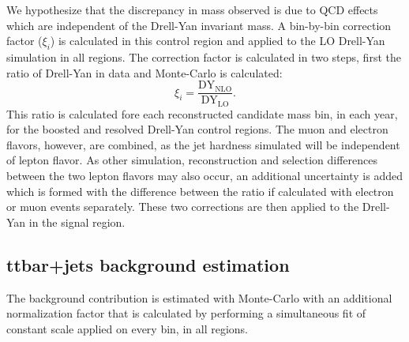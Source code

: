 We hypothesize that the discrepancy in \WR mass observed is due to QCD effects which are independent of the Drell-Yan invariant mass.
A bin-by-bin correction factor ($\xi_{i}$) is calculated in this control region and applied to the LO Drell-Yan simulation in all regions. The correction factor is calculated in two steps, first the ratio of Drell-Yan in data and Monte-Carlo is calculated:
\begin{equation}
    \xi_{i}
    =
    \frac{\mathrm{DY_{NLO}}}{\mathrm{DY_{LO}}}.
\end{equation}
This ratio is calculated fore each reconstructed \WR candidate mass bin, in each year, for the boosted and resolved Drell-Yan control regions. The muon and electron flavors, however, are combined, as the jet hardness simulated will be independent of lepton flavor. As other simulation, reconstruction and selection differences between the two lepton flavors may also occur, an additional uncertainty is added which is formed with the difference between the ratio if calculated with electron or muon events separately. These two corrections are then applied to the Drell-Yan in the signal region.


\subsection{ttbar+jets background estimation}
\label{sec:ttbarBkgd}

The \ttbar background contribution is estimated with Monte-Carlo with an additional normalization factor that is calculated by performing a simultaneous fit of constant scale applied on every bin, in all regions.

